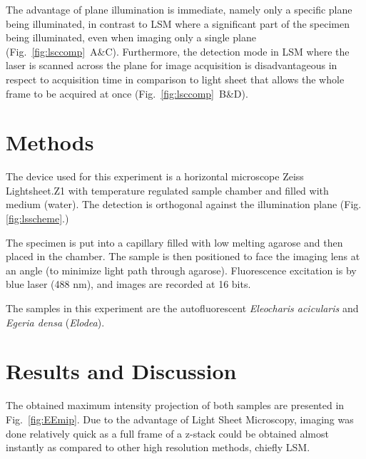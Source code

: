 The advantage of plane illumination is immediate, namely only a specific plane being illuminated, in contrast to LSM where a significant part of the specimen being illuminated, even when imaging only a single plane (Fig.~\ref{fig:lsccomp}~A\&C). 
Furthermore, the detection mode in LSM where the laser is scanned across the plane for image acquisition is disadvantageous in respect to acquisition time in comparison to light sheet that allows the whole frame to be acquired at once (Fig.~\ref{fig:lsccomp}~B\&D).


\section{Methods}

The device used for this experiment is a horizontal microscope Zeiss Lightsheet.Z1 with temperature regulated sample chamber and filled with medium (water). 
The detection is orthogonal against the illumination plane (Fig. \ref{fig:lsscheme}.) 

The specimen is put into a capillary filled with low melting agarose and then placed in the chamber. 
The sample is then positioned to face the imaging lens at an angle (to minimize light path through agarose). 
Fluorescence excitation is by blue laser (488 nm), and images are recorded at 16 bits.

The samples in this experiment are the autofluorescent \textit{Eleocharis acicularis} and \textit{Egeria densa} (\textit{Elodea}).

\section{Results and Discussion}

The obtained maximum intensity projection of both samples are presented in Fig.~\ref{fig:EEmip}. 
Due to the advantage of Light Sheet Microscopy, imaging was done relatively quick as a full frame of a z-stack could be obtained almost instantly as compared to other high resolution methods, chiefly LSM. 

